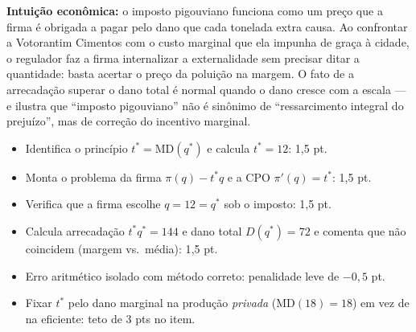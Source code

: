 \begin{solucao}
\textbf{Intuição econômica:} o imposto pigouviano funciona como um preço que a firma é obrigada a pagar pelo dano que cada tonelada extra causa. Ao confrontar a Votorantim Cimentos com o custo marginal que ela impunha de graça à cidade, o regulador faz a firma internalizar a externalidade sem precisar ditar a quantidade: basta acertar o preço da poluição na margem. O fato de a arrecadação superar o dano total é normal quando o dano cresce com a escala — e ilustra que ``imposto pigouviano'' não é sinônimo de ``ressarcimento integral do prejuízo'', mas de correção do incentivo marginal.
\rubricalabel
\begin{itemize}
\item Identifica o princípio $t^{*}=\text{MD}(q^{*})$ e calcula $t^{*}=12$: 1{,}5 pt.
\item Monta o problema da firma $\pi(q)-t^{*}q$ e a CPO $\pi'(q)=t^{*}$: 1{,}5 pt.
\item Verifica que a firma escolhe $q=12=q^{*}$ sob o imposto: 1{,}5 pt.
\item Calcula arrecadação $t^{*}q^{*}=144$ e dano total $D(q^{*})=72$ e comenta que não coincidem (margem vs.\ média): 1{,}5 pt.
\item Erro aritmético isolado com método correto: penalidade leve de $-0{,}5$ pt.
\item Fixar $t^{*}$ pelo dano marginal na produção \emph{privada} ($\text{MD}(18)=18$) em vez de na eficiente: teto de 3 pts no item.
\end{itemize}
\end{solucao}


